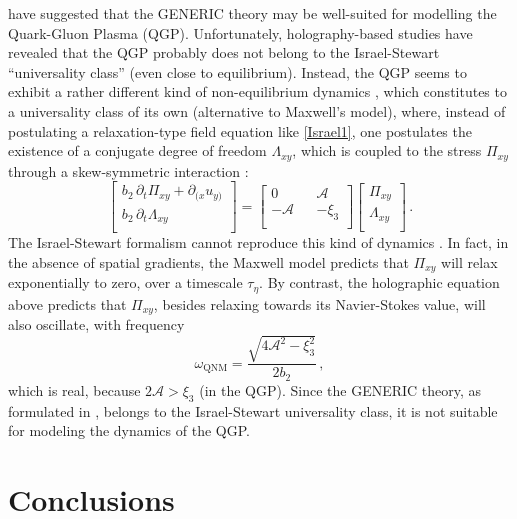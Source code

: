 \documentclass[a4paper, amsfonts, amssymb, amsmath, reprint, showkeys, nofootinbib, twoside, onecolumn, notitlepage]{revtex4-1}
\theoremstyle{definition}
\theoremstyle{theorem}
\begin{document}
\citet{Stricker2019} have suggested that the GENERIC theory may be well-suited for modelling the Quark-Gluon Plasma (QGP). Unfortunately, holography-based studies \cite{KovtunHolography2005,Noronha2011,Rougemont2021} have revealed that the QGP probably does not belong to the Israel-Stewart ``universality class'' (even close to equilibrium). Instead, the QGP seems to exhibit a rather different kind of non-equilibrium dynamics \cite{Heller2014}, which constitutes to a universality class of its own (alternative to Maxwell's model), where, instead of postulating a relaxation-type field equation like \eqref{Israel1}, one postulates the existence of a conjugate degree of freedom $\Lambda_{xy}$, which is coupled to the stress $\Pi_{xy}$ through a skew-symmetric interaction \cite{GavassinoQuasi2022}:
\begin{equation}
\begin{bmatrix}
 b_2 \, \partial_t \Pi_{xy} + \partial_{(x} u_{y)} \\
  b_2 \,  \partial_t\Lambda_{xy} \\
\end{bmatrix}
= 
\begin{bmatrix}
 0 & & \mathcal{A} \\
 -\mathcal{A} & & -\xi_3 \\
\end{bmatrix}
\begin{bmatrix}
 \Pi_{xy} \\
 \Lambda_{xy} \\
\end{bmatrix} \, .
\end{equation}
The Israel-Stewart formalism cannot reproduce this kind of dynamics \cite{Denicol_Relaxation_2011}. In fact, in the absence of spatial gradients, the Maxwell model predicts that $\Pi_{xy}$ will relax exponentially to zero, over a timescale $\tau_\eta$. By contrast, the holographic equation above predicts that $\Pi_{xy}$, besides relaxing towards its Navier-Stokes value, will also oscillate, with frequency
\begin{equation}
\omega_{\text{QNM}}=\dfrac{\sqrt{4\mathcal{A}^2 - \xi_3^2}}{2b_2}  \, ,
\end{equation}
which is real, because $2\mathcal{A}> \xi_3$ (in the QGP). Since the GENERIC theory, as formulated in \citep{Stricker2019}, belongs to the Israel-Stewart universality class, it is not suitable for modeling the dynamics of the QGP.

\section{Conclusions}
\end{document}
